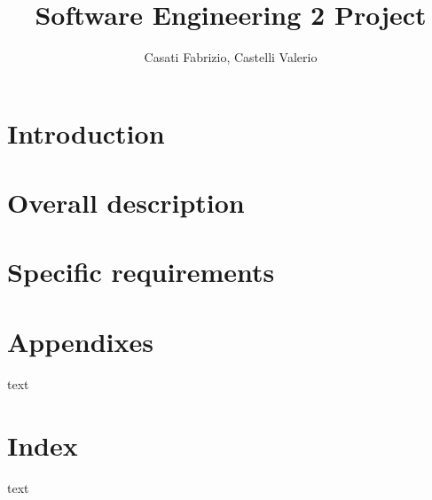 



\title{Software Engineering 2 Project}
\author{Casati Fabrizio, Castelli Valerio}

\maketitle
\tableofcontents

\chapter{Introduction}


\chapter{Overall description}


\chapter{Specific requirements}


\chapter*{Appendixes}
text

\chapter*{Index}
text

